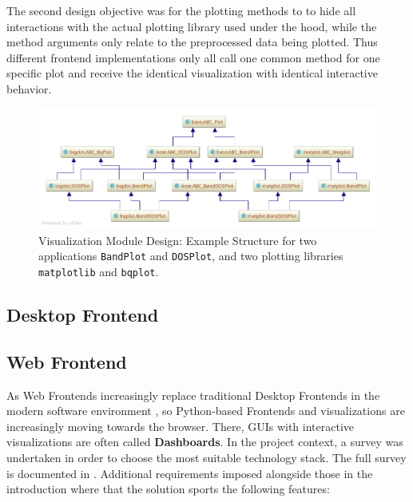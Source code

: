 The second design objective was for the plotting methods to to hide all
interactions with the actual plotting library used under the hood, while the
method arguments only relate to the preprocessed data being plotted. Thus
different frontend implementations only all call one common method for one
specific plot and receive the identical visualization with identical interactive
behavior.

\begin{figure}[htb!]
    \centering
    \includegraphics[width=1.0\linewidth]{img/pycharm_uml/matplot.png}
    \caption{Visualization Module Design: Example Structure for two applications
    \texttt{BandPlot} and \texttt{DOSPlot}, and two plotting libraries
    \texttt{matplotlib} and \texttt{bqplot}.}
    \label{fig:visualization-module}
\end{figure}

\subsection{Desktop Frontend}
\label{sec:desktop-frontend}

\subsection{Web Frontend}
\label{sec:web-frontend}

As Web Frontends increasingly replace traditional Desktop Frontends in the
modern software environment \cite{web-vs-desktop}, so Python-based Frontends and
visualizations are increasingly moving towards the browser. There, GUIs with
interactive visualizations are often called \textbf{Dashboards}. In the project
context, a survey was undertaken in order to choose the most suitable technology
stack. The full survey is documented in \cite{jw-notes}. Additional requirements
imposed alongside those in the introduction where that the solution sports the
following features:

